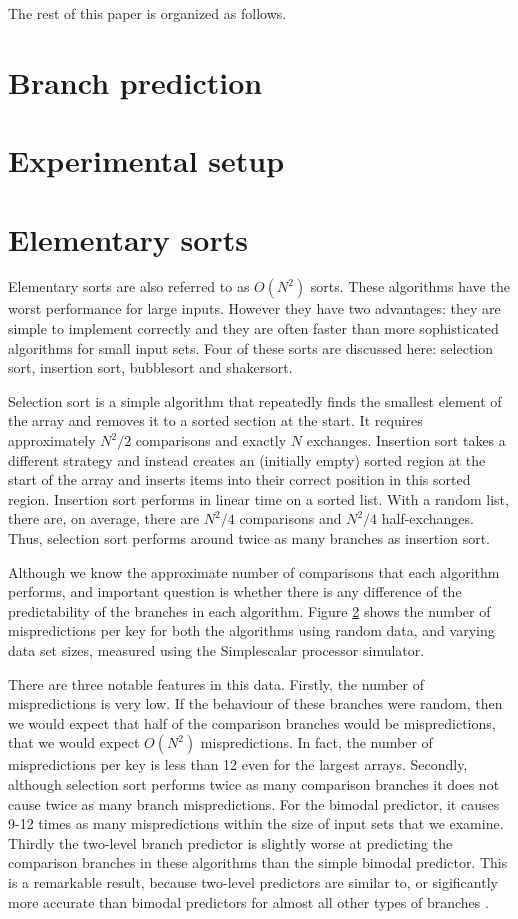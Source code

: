 \documentclass[acmtocl]{acmtrans2m}
\begin{document}
The rest of this paper is organized as follows.

\section{Branch prediction}

\section{Experimental setup}

\section{Elementary sorts}
\label{ordernsquared}
Elementary sorts are also referred to as $O(N^2)$ sorts. These
algorithms have the worst performance for large inputs. However they
have two advantages: they are simple to implement correctly and they
are often faster than more sophisticated algorithms for small input
sets. Four of these sorts are discussed here: selection sort,
insertion sort, bubblesort and shakersort.

Selection sort is a simple algorithm that repeatedly finds the
smallest element of the array and removes it to a sorted section at
the start. It requires approximately $N^2/2$ comparisons and exactly
$N$ exchanges. Insertion sort takes a different strategy and instead
creates an (initially empty) sorted region at the start of the array
and inserts items into their correct position in this sorted region.
Insertion sort performs in linear time on a sorted list. With a random
list, there are, on average, there are $N^2/4$ comparisons and $N^2/4$
half-exchanges. Thus, selection sort performs around twice as many
branches as insertion sort.

Although we know the approximate number of comparisons that each
algorithm performs, and important question is whether there is any
difference of the predictability of the branches in each algorithm.
Figure \ref{} shows the number of mispredictions per key for both the
algorithms using random data, and varying data set sizes, measured
using the Simplescalar processor simulator.

There are three notable features in this data. Firstly, the number of
mispredictions is very low. If the behaviour of these branches were
random, then we would expect that half of the comparison branches
would be mispredictions, that we would expect $O(N^2)$
mispredictions. In fact, the number of mispredictions per key is less
than 12 even for the largest arrays. Secondly, although selection sort
performs twice as many comparison branches it does not cause twice as
many branch mispredictions. For the bimodal predictor, it causes 9-12
times as many mispredictions within the size of input sets that we
examine. Thirdly the two-level branch predictor is slightly worse at
predicting the comparison branches in these algorithms than the simple
bimodal predictor.  This is a remarkable result, because two-level
predictors are similar to, or sigificantly more accurate than bimodal
predictors for almost all other types of branches \cite{Uht}.
\end{document}
